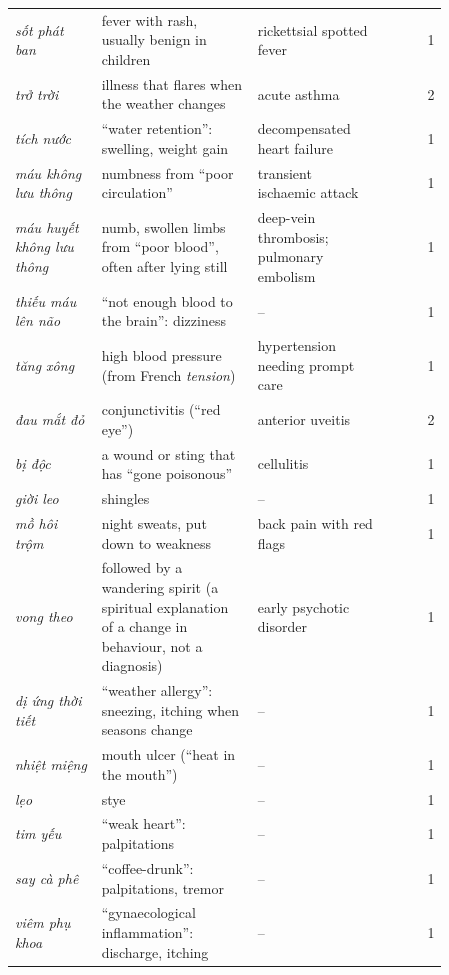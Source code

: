 \documentclass[runningheads]{llncs}
\newcommand{\vi}[1]{\textit{#1}}   %
\begin{document}
\begin{table}[h]
\begin{tabular}{p{0.2\linewidth}p{0.36\linewidth}p{0.3\linewidth}r}
\vi{sốt phát ban} & fever with rash, usually benign in children & rickettsial spotted fever & 1 \\
\vi{trở trời} & illness that flares when the weather changes & acute asthma & 2 \\
\vi{tích nước} & ``water retention'': swelling, weight gain & decompensated heart failure & 1 \\
\vi{máu không lưu thông} & numbness from ``poor circulation'' & transient ischaemic attack & 1 \\
\vi{máu huyết không lưu thông} & numb, swollen limbs from ``poor blood'', often after lying still & deep-vein thrombosis; pulmonary embolism & 1 \\
\vi{thiếu máu lên não} & ``not enough blood to the brain'': dizziness & -- & 1 \\
\vi{tăng xông} & high blood pressure (from French \emph{tension}) & hypertension needing prompt care & 1 \\
\vi{đau mắt đỏ} & conjunctivitis (``red eye'') & anterior uveitis & 2 \\
\vi{bị độc} & a wound or sting that has ``gone poisonous'' & cellulitis & 1 \\
\vi{giời leo} & shingles & -- & 1 \\
\vi{mồ hôi trộm} & night sweats, put down to weakness & back pain with red flags & 1 \\
\vi{vong theo} & followed by a wandering spirit (a spiritual explanation of a change in behaviour, not a diagnosis) & early psychotic disorder & 1 \\
\vi{dị ứng thời tiết} & ``weather allergy'': sneezing, itching when seasons change & -- & 1 \\
\vi{nhiệt miệng} & mouth ulcer (``heat in the mouth'') & -- & 1 \\
\vi{lẹo} & stye & -- & 1 \\
\vi{tim yếu} & ``weak heart'': palpitations & -- & 1 \\
\vi{say cà phê} & ``coffee-drunk'': palpitations, tremor & -- & 1 \\
\vi{viêm phụ khoa} & ``gynaecological inflammation'': discharge, itching & -- & 1 \\\bottomrule
\end{tabular}
\end{table}
\end{document}
